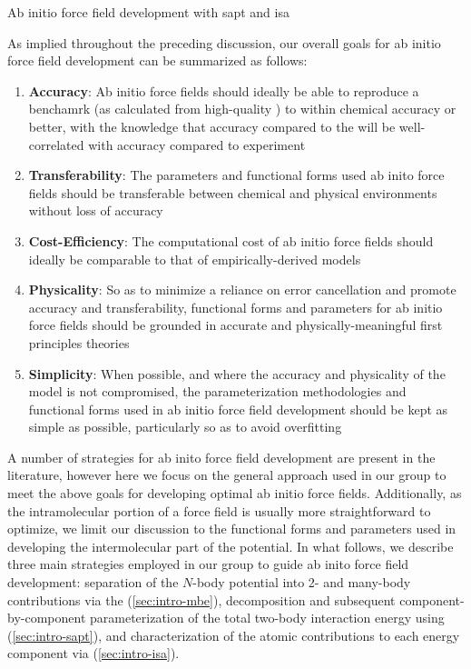 \begin{section}{Ab initio force field development with \acrshort{sapt} and
\acrshort{isa}}

As implied throughout the preceding discussion, our overall goals for ab
initio force field development can be summarized as follows:
\begin{enumerate}
\item \textbf{Accuracy}: 
Ab initio force fields should
ideally be able to reproduce a benchamrk \pes (as calculated from high-quality
\est) to within chemical accuracy or better, with the knowledge that accuracy
compared to the \pes will be well-correlated with accuracy compared to
experiment
\item \textbf{Transferability}: The parameters and
functional forms used ab inito force fields should be transferable between
chemical and physical environments without loss of accuracy
\item \textbf{Cost-Efficiency}: 
The computational cost of ab initio force fields should ideally be comparable to that
of empirically-derived models
\item \textbf{Physicality}: So as to minimize a reliance on error cancellation
and promote accuracy and transferability, functional forms and parameters for
ab initio force fields should be grounded in accurate and
physically-meaningful first principles theories
\item \textbf{Simplicity}: When possible, and where the accuracy and
physicality of the model is not compromised, the parameterization methodologies
and functional forms used in ab initio force field development should be kept
as simple as possible, particularly so as to avoid overfitting
\end{enumerate}

A number of strategies for ab inito force field development are present in the
literature,\cite{Stone2007,Ballone2014} however here we focus on the general
approach used in our group\cite{Schmidt2015} to meet the above goals for
developing optimal ab initio force fields. Additionally,
as the intramolecular portion of a force field is
usually more straightforward to optimize,\cite{} we limit our discussion to
the functional forms and parameters used in developing the intermolecular part
of the potential.
In what follows, we describe three main strategies employed in our group to
guide ab inito force field development: separation of the $N$-body
potential into 2- and many-body contributions via the \mbe (\cref{sec:intro-mbe}), decomposition and
subsequent component-by-component parameterization of the total two-body
interaction energy using \sapt (\cref{sec:intro-sapt}), and characterization
of the atomic contributions to each energy component via \isa
(\cref{sec:intro-isa}).


\end{section}
